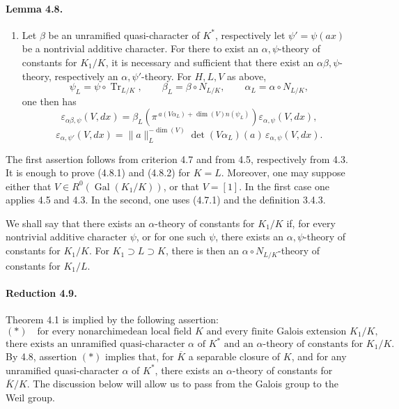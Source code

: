 \documentclass[10pt,letterpaper]{article}
\newcommand{\Gal}{\operatorname{Gal}}
\newcommand{\Tr}{\operatorname{Tr}}
\providecommand{\Gal}{\operatorname{Gal}}
\providecommand{\Gal}{\operatorname{Gal}}
\providecommand{\Tr}{\operatorname{Tr}}
\providecommand{\Gal}{\operatorname{Gal}}
\providecommand{\Tr}{\operatorname{Tr}}
\providecommand{\Gal}{\operatorname{Gal}}
\providecommand{\Tr}{\operatorname{Tr}}
\begin{document}
\paragraph{Lemma 4.8.}
\begin{enumerate}[label=(\roman*)]
\item Let \(\beta\) be an unramified quasi-character of \(K^*\), respectively let \(\psi'=\psi(ax)\) be a nontrivial additive character. For there to exist an \(\alpha,\psi\)-theory of constants for \(K_1/K\), it is necessary and sufficient that there exist an \(\alpha\beta,\psi\)-theory, respectively an \(\alpha,\psi'\)-theory. For \(H,L,V\) as above,
\[
\psi_L=\psi\circ\Tr_{L/K},\qquad
\beta_L=\beta\circ N_{L/K},\qquad
\alpha_L=\alpha\circ N_{L/K},
\]
one then has
\[
\tag{4.8.1}
\varepsilon_{\alpha\beta,\psi}(V,dx)
=
\beta_L\!\left(\pi^{\,a(V\alpha_L)+\dim(V)n(\psi_L)}\right)
\varepsilon_{\alpha,\psi}(V,dx),
\]
\[
\tag{4.8.2}
\varepsilon_{\alpha,\psi'}(V,dx)
=
\|a\|_L^{-\dim(V)}
\det(V\alpha_L)(a)\,
\varepsilon_{\alpha,\psi}(V,dx).
\]
\end{enumerate}
The first assertion follows from criterion 4.7 and from 4.5, respectively from 4.3. It is enough to prove (4.8.1) and (4.8.2) for \(K=L\). Moreover, one may suppose either that \(V\in R^0(\Gal(K_1/K))\), or that \(V=[1]\). In the first case one applies 4.5 and 4.3. In the second, one uses (4.7.1) and the definition 3.4.3.

We shall say that there exists an \(\alpha\)-theory of constants for \(K_1/K\) if, for every nontrivial additive character \(\psi\), or for one such \(\psi\), there exists an \(\alpha,\psi\)-theory of constants for \(K_1/K\). For \(K_1\supset L\supset K\), there is then an \(\alpha\circ N_{L/K}\)-theory of constants for \(K_1/L\).

\paragraph{Reduction 4.9.} Theorem 4.1 is implied by the following assertion:
\[
(*)\quad
\text{for every nonarchimedean local field }K\text{ and every finite Galois extension }K_1/K,
\]
\[
\text{there exists an unramified quasi-character }\alpha\text{ of }K^*
\text{ and an }\alpha\text{-theory of constants for }K_1/K.
\]
By 4.8, assertion \((*)\) implies that, for \(\overline K\) a separable closure of \(K\), and for any unramified quasi-character \(\alpha\) of \(K^*\), there exists an \(\alpha\)-theory of constants for \(\overline K/K\). The discussion below will allow us to pass from the Galois group to the Weil group.
\end{document}
